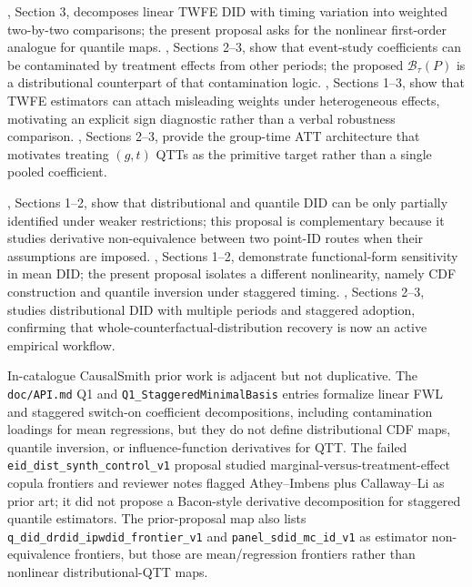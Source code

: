 \documentclass[11pt]{article}
\theoremstyle{definition}
\theoremstyle{plain}
\theoremstyle{remark}
\begin{document}
\citet{GoodmanBacon2021}, Section 3, decomposes linear TWFE DID with timing variation into weighted two-by-two comparisons; the present proposal asks for the nonlinear first-order analogue for quantile maps.  \citet{SunAbraham2021}, Sections 2--3, show that event-study coefficients can be contaminated by treatment effects from other periods; the proposed \(\mathcal B_\tau(P)\) is a distributional counterpart of that contamination logic.  \citet{deChaisemartinDHaultfoeuille2020}, Sections 1--3, show that TWFE estimators can attach misleading weights under heterogeneous effects, motivating an explicit sign diagnostic rather than a verbal robustness comparison.  \citet{CallawaySantAnna2021}, Sections 2--3, provide the group-time ATT architecture that motivates treating \((g,t)\) QTTs as the primitive target rather than a single pooled coefficient.

\citet{FanYu2012}, Sections 1--2, show that distributional and quantile DID can be only partially identified under weaker restrictions; this proposal is complementary because it studies derivative non-equivalence between two point-ID routes when their assumptions are imposed.  \citet{RothSantAnna2023}, Sections 1--2, demonstrate functional-form sensitivity in mean DID; the present proposal isolates a different nonlinearity, namely CDF construction and quantile inversion under staggered timing.  \citet{Ciaccio2025}, Sections 2--3, studies distributional DID with multiple periods and staggered adoption, confirming that whole-counterfactual-distribution recovery is now an active empirical workflow.

In-catalogue CausalSmith prior work is adjacent but not duplicative.  The \texttt{doc/API.md} Q1 and \texttt{Q1\_StaggeredMinimalBasis} entries formalize linear FWL and staggered switch-on coefficient decompositions, including contamination loadings for mean regressions, but they do not define distributional CDF maps, quantile inversion, or influence-function derivatives for QTT.  The failed \texttt{eid\_dist\_synth\_control\_v1} proposal studied marginal-versus-treatment-effect copula frontiers and reviewer notes flagged Athey--Imbens plus Callaway--Li as prior art; it did not propose a Bacon-style derivative decomposition for staggered quantile estimators.  The prior-proposal map also lists \texttt{q\_did\_drdid\_ipwdid\_frontier\_v1} and \texttt{panel\_sdid\_mc\_id\_v1} as estimator non-equivalence frontiers, but those are mean/regression frontiers rather than nonlinear distributional-QTT maps.
\end{document}

